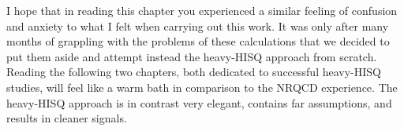 I hope that in reading this chapter you experienced a similar feeling of confusion and anxiety to what I felt when carrying out this work. It was only after many months of grappling with the problems of these calculations that we decided to put them aside and attempt instead the heavy-HISQ approach from scratch. Reading the following two chapters, both dedicated to successful heavy-HISQ studies, will feel like a warm bath in comparison to the NRQCD experience. The heavy-HISQ approach is in contrast very elegant, contains far assumptions, and results in cleaner signals.
